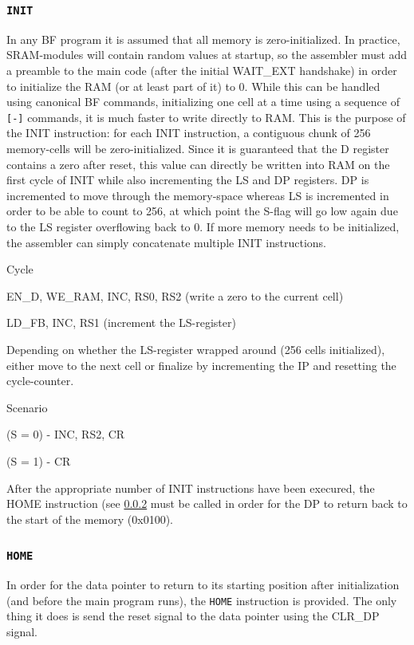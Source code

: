 \subsubsection{\texttt{INIT}} \label{sec:sequences:init}
In any BF program it is assumed that all memory is zero-initialized. In practice, SRAM-modules will contain random values at startup, so the assembler must add a preamble to the main code (after the initial WAIT\_EXT handshake) in order to initialize the RAM (or at least part of it) to 0. While this can be handled using canonical BF commands, initializing one cell at a time using a sequence of \texttt{[-]} commands, it is much faster to write directly to RAM. This is the purpose of the INIT instruction: for each INIT instruction, a contiguous chunk of 256 memory-cells will be zero-initialized. Since it is guaranteed that the D register contains a zero after reset, this value can directly be written into RAM on the first cycle of INIT while also incrementing the LS and DP registers. DP is incremented to move through the memory-space whereas LS is incremented in order to be able to count to 256, at which point the S-flag will go low again due to the LS register overflowing back to 0. If more memory needs to be initialized, the assembler can simply concatenate multiple INIT instructions.

\begin{labeledenum}{Cycle}
\item EN\_D, WE\_RAM, INC, RS0, RS2 (write a zero to the current cell)
\item LD\_FB, INC, RS1 (increment the LS-register)
\item Depending on whether the LS-register wrapped around (256 cells initialized), either move to the next cell or finalize by incrementing the IP and resetting the cycle-counter.

  \begin{labeledenum}{Scenario}
  \item (S = 0) - INC, RS2, CR
  \item (S = 1) - CR
  \end{labeledenum}

\end{labeledenum}
After the appropriate number of INIT instructions have been execured, the HOME instruction (see \ref{sec:sequences:home} must be called in order for the DP to return back to the start of the memory (0x0100).

\subsubsection{\texttt{HOME}} \label{sec:sequences:home}
In order for the data pointer to return to its starting position after initialization (and before the main program runs), the \texttt{HOME} instruction is provided. The only thing it does is send the reset signal to the data pointer using the CLR\_DP signal.


